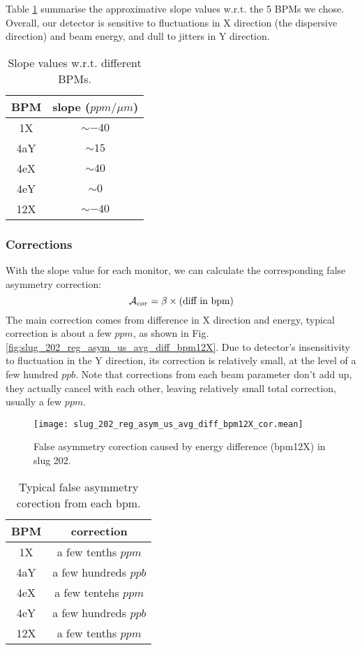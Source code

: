 Table \ref{tab:crex_slope} summarise the approximative slope values w.r.t. the 5
BPMs we chose. Overall, our detector is sensitive to fluctuations in X direction
(the dispersive direction) and beam energy, and dull to jitters in Y direction.
\begin{table}[!h]
    \centering
    \begin{tabular}{c | c}
	\hline
	BPM & slope ($ppm/\mu m$)   \\
	\hline
	1X  & $\sim -40$    \\
	4aY & $\sim 15$    \\
	4eX & $\sim 40$	\\
	4eY & $\sim 0$	\\
	12X & $\sim -40$    \\
	\hline
    \end{tabular}
    \caption{Slope values w.r.t. different BPMs.}
    \label{tab:crex_slope}
\end{table}

\subsubsection{Corrections}
With the slope value for each monitor, we can calculate the corresponding
false asymmetry correction:
\begin{equation}
    \mathcal{A}_{cor} = \beta \times \text{(diff in bpm)}
\end{equation}
The main correction comes from difference in X direction and energy,
typical correction is about a few $ppm$, as shown in Fig. \ref{fig:slug_202_reg_asym_us_avg_diff_bpm12X}.
Due to detector's insensitivity to fluctuation in the Y direction, its correction 
is relatively small, at the level of  a few hundred $ppb$. Note that corrections
from each beam parameter don't add up, they actually cancel with each other,
leaving relatively small total correction, usually a few $ppm$.

\begin{figure}[H]
    \centering
    \texttt{[image: slug\_202\_reg\_asym\_us\_avg\_diff\_bpm12X\_cor.mean]}
    \caption{False asymmetry corection caused by energy difference (bpm12X) in
    slug 202.}
    \label{fig:slug_202_reg_asym_us_avg_diff_bpm12X_cor}
\end{figure}

\begin{table}[!h]
    \centering
    \begin{tabular}{c | c}
	\hline
	BPM  & correction   \\
	\hline
	1X  & a few tenths $ppm$ \\
	4aY & a few hundreds $ppb$     \\
	4eX & a few tentehs $ppm$ \\
	4eY & a few hundreds $ppb$     \\
	12X  & a few tenths $ppm$ \\
	\hline
    \end{tabular}
    \caption{Typical false asymmetry corection from each bpm.}
\end{table}

